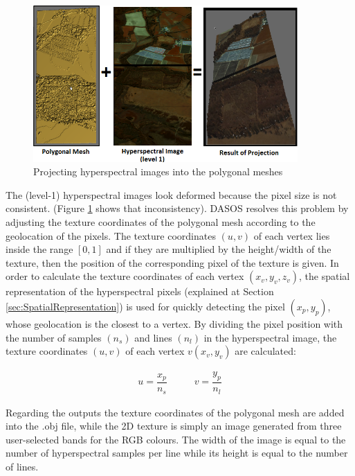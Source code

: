 \documentclass{subfiles}
\begin{document}
	
		 \begin{figure} [h!]
		 	\centering
		 	\includegraphics[width=0.9\textwidth]{img/ProjectingHyperspectral}
		 	\caption{Projecting hyperspectral images into the polygonal meshes}
		 	\label{fig:ProjectingHyperspectral}
		 \end{figure}
		 

	
			
	\par  The (level-1) hyperspectral images look deformed because the pixel size is not consistent. {\color{blue} (Figure \ref{fig:ProjectingHyperspectral} shows that inconsistency).}
	 DASOS resolves this problem by adjusting the texture coordinates of the polygonal mesh according to the geolocation of the pixels. The texture coordinates $(u, v)$ of each vertex lies inside the range $[0, 1]$ and if they are multiplied by the height/width of the texture, then the position of the corresponding pixel of the texture is given. In order to calculate the texture coordinates of each vertex $(x_v, y_v, z_v)$, the spatial representation of the hyperspectral pixels (explained at Section \ref{sec:SpatialRepresentation}) is used for quickly detecting the pixel $(x_p, y_p )$, whose geolocation is the closest to a vertex. By dividing the pixel position with the number of samples $(n_s)$ and lines $(n_l)$ in the hyperspectral image, the texture coordinates $(u, v)$ of each vertex $v(x_v , y_v)$ are calculated:
		
	\begin{eqnarray}
	u=\dfrac{x_p}{n_s} \;\;\;\;\;\;\;\;\;\; v=\dfrac{y_p}{n_l}
	\end{eqnarray}
	
	\par Regarding the outputs the texture coordinates of the polygonal mesh are added into the .obj file, while the 2D texture is simply an image generated from three user-selected bands for the RGB colours. The width of the image is equal to the number of hyperspectral samples per line while its height is equal to the number of lines.
	
\end{document}
